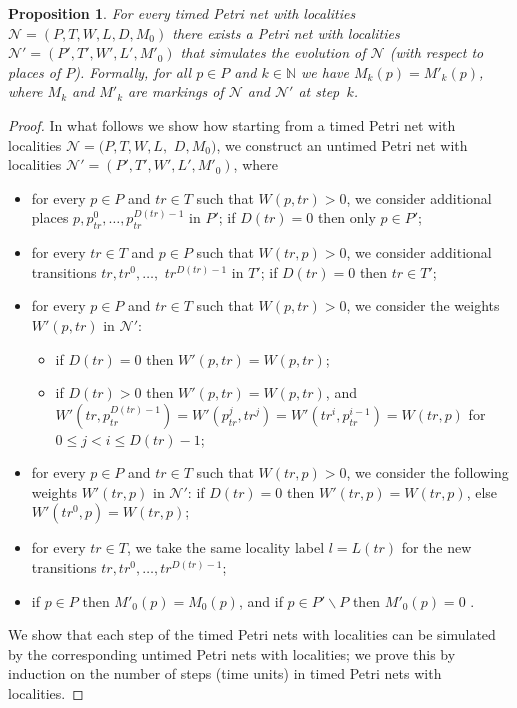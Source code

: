 \documentclass{eptcs}
\newtheorem{proposition}{Proposition}
\begin{document}
\begin{proposition}
\label{tPNtoPN} For every timed Petri net with localities
$\mathcal{N}=(P,T,W,L,D,M_0)$ there exists a Petri net with
localities $\mathcal{N}'=(P',T',W',L',M'_0)$ that simulates the
evolution of $\mathcal{N}$ (with respect to places of $P$).
Formally, for all $p\in P$ and $k \in \mathds{N}$ we have
$M_k(p)=M'_k(p)$, where $M_k$ and $M'_k$ are markings of $\mathcal{N}$ and
$\mathcal{N}'$ at step~$k$.
\end{proposition}

\begin{proof} In what follows we show how starting from
a timed Petri net with localities $\mathcal{N}=(P,T,W,L,$
$D,M_0)$, we construct an untimed Petri net with localities
$\mathcal{N}'=(P',T',W',L',M'_0)$, where
\begin{itemize}
\item for every $p\in P$ and $tr\in T$ such that $W(p,tr)>0$, we
consider additional places $p,p^{0}_{tr}, \ldots, p^{D(tr)-1}_{tr}$
in $P'$; if $D(tr)=0$ then only $p\in P'$;

\item for every $tr\in T$ and $p\in P$ such that $W(tr,p)>0$, we consider
additional transitions $tr,tr^{0}, \ldots,$ $tr^{D(tr)-1}$ in $T'$; if
$D(tr)=0$ then $tr\in T'$;

\item for every $p\in P$ and $tr\in T$ such that $W(p,tr)>0$,
we consider the weights $W'(p,tr)$ in $\mathcal{N}'$:
\begin{itemize}
\item if $D(tr)=0$ then $W'(p,tr)=W(p,tr)$;
\item if $D(tr)>0$ then $W'(p,tr)=W(p,tr)$, and \\
$W'(tr,p^{D(tr)-1}_{tr})=W'(p^j_{tr},tr^j)=W'(tr^i,p^{i-1}_{tr})=W(tr,p)$
for $0\! \leq\! j<i \!\leq\! D(tr)-1$;
\end{itemize}

\item for every $p\in P$ and $tr\in T$ such that
$W(tr,p)>0$, we consider the following weights $W'(tr,p)$ in
$\mathcal{N}'$:
if $D(tr)=0$ then $W'(tr,p)=W(tr,p)$, else $W'(tr^{0},p)=W(tr,p)$;

\item for every $tr\in T$, we take the same locality label
$l=L(tr)$ for the new transitions $tr,tr^{0}, \ldots, tr^{D(tr)-1}$;

\item if $p \in P$ then
$M'_0(p)=M_0(p)$, and if $p\in P'\backslash P$ then $M'_0(p)=0$ .
\end{itemize}
We show that each step of the timed Petri nets with localities can
be simulated by the corresponding untimed Petri nets with localities;
we prove this by induction on the number of steps (time units)
in timed Petri nets with localities.


\end{proof}
\end{document}
